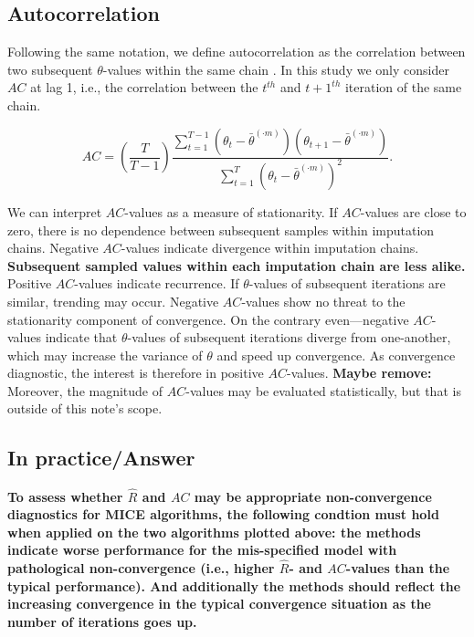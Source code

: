 \documentclass[Royal,times,sageh]{sagej}
\begin{document}
\hypertarget{autocorrelation}{%
\subsection{Autocorrelation}\label{autocorrelation}}

Following the same notation, we define autocorrelation as the
correlation between two subsequent \(\theta\)-values within the same
chain \citep[p.~147]{lync07}. In this study we only consider \(AC\) at
lag 1, i.e., the correlation between the \(t^{th}\) and \(t+1^{th}\)
iteration of the same chain.

\begin{equation*}
AC = \left( \frac{T}{T-1} \right) \frac{\sum_{t=1}^{T-1}(\theta_t - \bar{\theta}^{(\cdot m)})(\theta_{t+1} - \bar{\theta}^{(\cdot m)})}{\sum_{t=1}^{T}(\theta_t - \bar{\theta}^{(\cdot m)})^2}.
\end{equation*}

We can interpret \(AC\)-values as a measure of stationarity. If
\(AC\)-values are close to zero, there is no dependence between
subsequent samples within imputation chains. Negative \(AC\)-values
indicate divergence within imputation chains. \textbf{Subsequent sampled
values within each imputation chain are less alike.} Positive
\(AC\)-values indicate recurrence. If \(\theta\)-values of subsequent
iterations are similar, trending may occur. Negative \(AC\)-values show
no threat to the stationarity component of convergence. On the contrary
even---negative \(AC\)-values indicate that \(\theta\)-values of
subsequent iterations diverge from one-another, which may increase the
variance of \(\theta\) and speed up convergence. As convergence
diagnostic, the interest is therefore in positive \(AC\)-values.
\textbf{Maybe remove:} Moreover, the magnitude of \(AC\)-values may be
evaluated statistically, but that is outside of this note's scope.

\hypertarget{in-practiceanswer}{%
\subsection{In practice/Answer}\label{in-practiceanswer}}

\textbf{To assess whether \(\widehat{R}\) and \(AC\) may be appropriate
non-convergence diagnostics for MICE algorithms, the following condtion
must hold when applied on the two algorithms plotted above: the methods
indicate worse performance for the mis-specified model with pathological
non-convergence (i.e., higher \(\widehat{R}\)- and \(AC\)-values than
the typical performance). And additionally the methods should reflect
the increasing convergence in the typical convergence situation as the
number of iterations goes up.}
\end{document}
